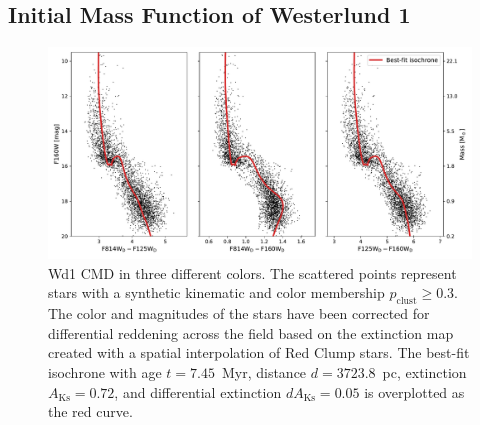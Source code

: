 \documentclass[12pt]{ucsddissertation}
\newcommand{\AKs}{A_{\mathrm{Ks}}}
\newcommand{\pclust}{p_{\mathrm{clust}}}
\begin{document}
\begin{CJK*}{UTF8}{gbsn}
\section{Initial Mass Function of Westerlund 1}
\begin{figure}[htb!]
    \centering
    \includegraphics[width=\linewidth]{figures/chapter3/3_color_cmd.pdf}
    \caption[Westerlund 1 color-magnitude diagram in 3 different colors]{Wd1 CMD in three different colors. The scattered points represent stars with a synthetic kinematic and color membership $\pclust \geq 0.3$. The color and magnitudes of the stars have been corrected for differential reddening across the field based on the extinction map created with a spatial interpolation of Red Clump stars. The best-fit isochrone with age $t = 7.45$~Myr, distance $d = 3723.8$~pc, extinction $\AKs = 0.72$, and differential extinction $d\AKs = 0.05$ is overplotted as the red curve.}
    \label{fig:3_color_cmd}
\end{figure}



\end{CJK*}
\end{document}
